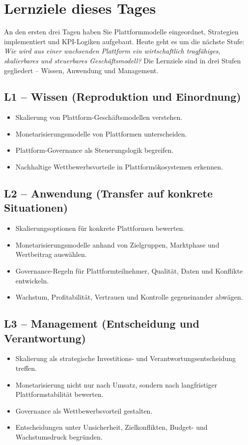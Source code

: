 \documentclass[11pt,a4paper,oneside]{article}
\begin{document}
\section*{Lernziele dieses Tages}
\thispagestyle{plain}

\noindent An den ersten drei Tagen haben Sie Plattformmodelle eingeordnet, Strategien implementiert und KPI-Logiken aufgebaut. Heute geht es um die nächste Stufe: \emph{Wie wird aus einer wachsenden Plattform ein wirtschaftlich tragfähiges, skalierbares und steuerbares Geschäftsmodell?} Die Lernziele sind in drei Stufen gegliedert -- Wissen, Anwendung und Management.

\subsection*{L1 -- Wissen (Reproduktion und Einordnung)}
\begin{itemize}
  \item Skalierung von Plattform-Geschäftsmodellen verstehen.
  \item Monetarisierungsmodelle von Plattformen unterscheiden.
  \item Plattform-Governance als Steuerungslogik begreifen.
  \item Nachhaltige Wettbewerbsvorteile in Plattformökosystemen erkennen.
\end{itemize}

\subsection*{L2 -- Anwendung (Transfer auf konkrete Situationen)}
\begin{itemize}
  \item Skalierungsoptionen für konkrete Plattformen bewerten.
  \item Monetarisierungsmodelle anhand von Zielgruppen, Marktphase und Wertbeitrag auswählen.
  \item Governance-Regeln für Plattformteilnehmer, Qualität, Daten und Konflikte entwickeln.
  \item Wachstum, Profitabilität, Vertrauen und Kontrolle gegeneinander abwägen.
\end{itemize}

\subsection*{L3 -- Management (Entscheidung und Verantwortung)}
\begin{itemize}
  \item Skalierung als strategische Investitions- und Verantwortungsentscheidung treffen.
  \item Monetarisierung nicht nur nach Umsatz, sondern nach langfristiger Plattformstabilität bewerten.
  \item Governance als Wettbewerbsvorteil gestalten.
  \item Entscheidungen unter Unsicherheit, Zielkonflikten, Budget- und Wachstumsdruck begründen.
\end{itemize}
\end{document}
